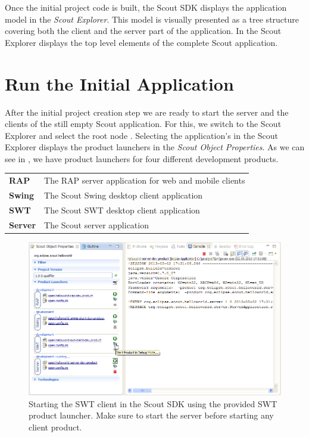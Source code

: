 \documentclass[a4paper,10pt,twoside]{book}
\begin{document}
Once the initial project code is built, the Scout SDK displays the application model in the \textit{Scout Explorer}.
This model is visually presented as a tree structure covering both the client and the server part of the application.
In  the Scout Explorer displays the top level elements of the complete Scout application.

\section{Run the Initial Application}

After the initial project creation step we are ready to start the server and the clients of the still empty Scout application.
For this, we switch to the Scout Explorer and select the root node .
Selecting the application's  in the Scout Explorer displays the product launchers in the \textit{Scout Object Properties}.
As we can see in , we have product launchers for four different development products.

\begin{tabular}{ l l }
  \textbf{RAP}    & The RAP server application for web and mobile clients\\
  \textbf{Swing}  & The Scout Swing desktop client application\\
  \textbf{SWT}    & The Scout SWT desktop client application\\
  \textbf{Server} & The Scout server application\\
\end{tabular}

\begin{figure}
\includegraphics[width=14cm]{sdk_start_client_product.png} 
\caption{Starting the SWT client in the Scout SDK using the provided SWT product launcher. Make sure to start the server before starting any client product.}
\end{figure}
\end{document}
